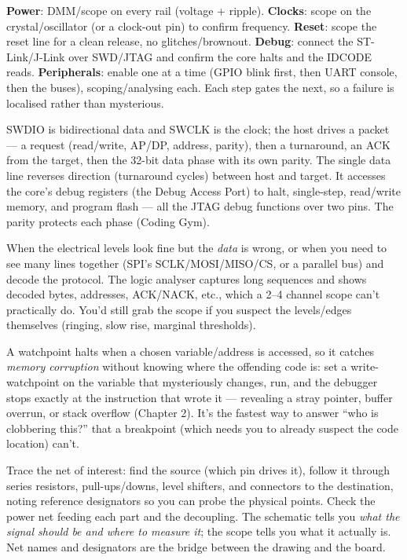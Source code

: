 \textbf{Power}: DMM/scope on every rail (voltage + ripple). \textbf{Clocks}:
scope on the crystal/oscillator (or a clock-out pin) to confirm frequency.
\textbf{Reset}: scope the reset line for a clean release, no glitches/brownout.
\textbf{Debug}: connect the ST-Link/J-Link over SWD/JTAG and confirm the core
halts and the IDCODE reads. \textbf{Peripherals}: enable one at a time (GPIO
blink first, then UART console, then the buses), scoping/analysing each. Each step
gates the next, so a failure is localised rather than mysterious.

SWDIO is bidirectional data and SWCLK is the clock; the host drives a packet ---
a request (read/write, AP/DP, address, parity), then a turnaround, an ACK from
the target, then the 32-bit data phase with its own parity. The single data line
reverses direction (turnaround cycles) between host and target. It accesses the
core's debug registers (the Debug Access Port) to halt, single-step, read/write
memory, and program flash --- all the JTAG debug functions over two pins. The
parity protects each phase (Coding Gym).

When the electrical levels look fine but the \emph{data} is wrong, or when you
need to see many lines together (SPI's SCLK/MOSI/MISO/CS, or a parallel bus) and
decode the protocol. The logic analyser captures long sequences and shows
decoded bytes, addresses, ACK/NACK, etc., which a 2--4 channel scope can't
practically do. You'd still grab the scope if you suspect the levels/edges
themselves (ringing, slow rise, marginal thresholds).

A watchpoint halts when a chosen variable/address is accessed, so it catches
\emph{memory corruption} without knowing where the offending code is: set a
write-watchpoint on the variable that mysteriously changes, run, and the debugger
stops exactly at the instruction that wrote it --- revealing a stray pointer,
buffer overrun, or stack overflow (Chapter 2). It's the fastest way to answer
``who is clobbering this?'' that a breakpoint (which needs you to already suspect
the code location) can't.

Trace the net of interest: find the source (which pin drives it), follow it
through series resistors, pull-ups/downs, level shifters, and connectors to the
destination, noting reference designators so you can probe the physical points.
Check the power net feeding each part and the decoupling. The schematic tells you
\emph{what the signal should be and where to measure it}; the scope tells you what
it actually is. Net names and designators are the bridge between the drawing and
the board.

